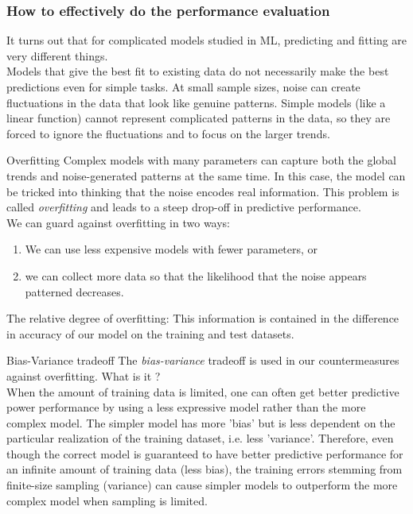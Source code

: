 \subsubsection{How to effectively do the performance evaluation}
It turns out that for complicated models studied in ML, predicting and fitting are very different things.\\
	Models that give the best fit to existing data do not necessarily make the best predictions even for simple tasks. At small sample sizes, noise can create fluctuations in the data that look like genuine patterns. Simple models (like a linear function) cannot represent complicated patterns in the data, so they are forced to ignore the fluctuations and to focus on the larger trends. 
\begin{mybox}{Overfitting}
	\label{subsubsec:overfitting}
Complex models with many parameters can capture both the global trends and noise-generated patterns at the same time. In this case, the model can be tricked into thinking that the noise encodes real information. This problem is called \emph{overfitting} and leads to a steep drop-off in predictive performance.\\
We can guard against overfitting in two ways:
\begin{enumerate}
	\item We can use less expensive models with fewer parameters, or
	\item we can collect more data so that the likelihood that the noise appears patterned decreases.
\end{enumerate}
The relative degree of overfitting: This information is contained in the difference in accuracy of our model on the training  and test datasets.
\end{mybox}
\begin{mybox}{Bias-Variance tradeoff}
	\label{subsubsec:biasvariancetradeoff}
	The \emph{bias-variance} tradeoff is used in our countermeasures against overfitting. What is it ?\\When the amount of training data is limited, one can often get better predictive power performance by using a less expressive model rather than the more complex model. The simpler model has more ’bias’ but is less dependent on the particular realization of the training dataset, i.e. less ’variance’. Therefore, even though the correct model is guaranteed to have better predictive performance for an infinite amount of training data (less bias), the training errors stemming from finite-size sampling (variance) can cause simpler models to outperform the more complex model when sampling is limited.
\end{mybox}
